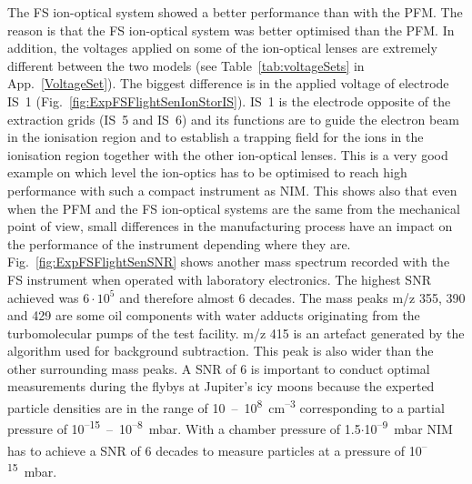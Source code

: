 		The FS ion-optical system showed a better performance than with the PFM. The reason is that the FS ion-optical system was better optimised than the PFM. In addition, the voltages applied on some of the ion-optical lenses are extremely different between the two models (see Table~\ref{tab:voltageSets} in App.~\ref{VoltageSet}). The biggest difference is in the applied voltage of electrode IS~1 (Fig.~\ref{fig:ExpFSFlightSenIonStorIS}). IS~1 is the electrode opposite of the extraction grids (IS~5 and IS~6) and its functions are to guide the electron beam in the ionisation region and to establish a trapping field for the ions in the ionisation region together with the other ion-optical lenses. This is a very good example on which level the ion-optics has to be optimised to reach high performance with such a compact instrument as NIM. This shows also that even when the PFM and the FS ion-optical systems are the same from the mechanical point of view, small differences in the manufacturing process have an impact on the performance of the instrument depending where they are.\\
		Fig.~\ref{fig:ExpFSFlightSenSNR} shows another mass spectrum recorded with the FS instrument when operated with laboratory electronics. The highest SNR achieved was $6\cdot10^{5}$ and therefore almost 6 decades. The mass peaks m/z 355, 390 and 429 are some oil components with water adducts originating from the turbomolecular pumps of the test facility. m/z 415 is an artefact generated by the algorithm used for background subtraction. This peak is also wider than the other surrounding mass peaks. A SNR of 6 is important to conduct optimal measurements during the flybys at Jupiter's icy moons because the experted particle densities are in the range of 10~--~10\textsuperscript{8}~cm\textsuperscript{--3} \cite{Vorburger2015, Vorburger_2018} corresponding to a partial pressure of 10\textsuperscript{--15}~--~10\textsuperscript{--8}~mbar. With a chamber pressure of 1.5$\cdot$10\textsuperscript{--9}~mbar NIM has to achieve a SNR of 6 decades to measure particles at a pressure of 10\textsuperscript{--15}~mbar.\\
		
